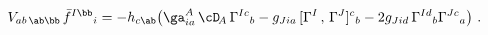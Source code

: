 \begin{equation}
  V_{ab\,\ab\bb}\, \bar{f}^{I\bb}{}_i = - h_{c\ab} \big( \ga^A_{ia}\,
  \cD_{\!A}\, \Gamma^{Ic}{}_b - g_{Jia}\, [ \Gamma^I\, ,\, \Gamma^J
  ]^c{}_b - 2 g_{Jid}\, \Gamma^{Id}{}_b \Gamma^{Jc}{}_a \big)\ .
 \end{equation}

